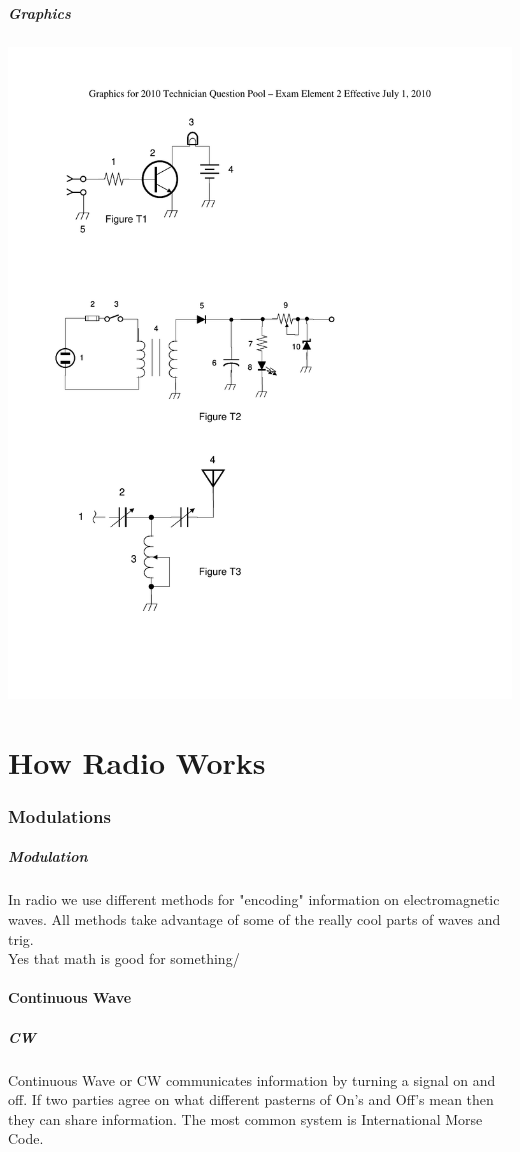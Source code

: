 \documentclass[10pt]{beamer}
\begin{document}
\begin{frame}
\frametitle{Graphics}
\includegraphics[pages={1},height=.9\textheight]{2010element2graphics.pdf}
\end{frame}

\part{How Radio Works}
\section{Modulations}
\begin{frame}
\frametitle{Modulation}
In radio we use different methods for "encoding" information on electromagnetic waves. All methods take advantage of some of the really cool parts of waves and trig.\\
Yes that math is good for something/
\end{frame}


\subsection{Continuous Wave}
\begin{frame}
\frametitle{CW}
Continuous Wave or CW communicates information by turning a signal on and off. If two parties agree on what different pasterns of On's and Off's mean then they can share information. The most common system is International Morse Code. 
\end{frame}
\end{document}
